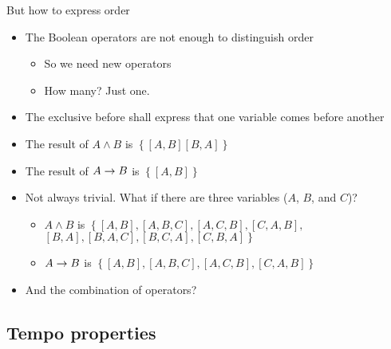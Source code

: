 \documentclass{beamer}
\def\xbeforeop{\ensuremath\rightarrow}
\newcommand{\xbefore}[2]{\ensuremath #1 \xbeforeop #2 }
\begin{document}
\begin{frame}{But how to express order}
	\begin{itemize}
		\item The Boolean operators are not enough to distinguish order
		\begin{itemize}
			\item So we need new operators
			\item How many? Just one.
		\end{itemize}
		\item The exclusive before shall express that one variable comes before another
		\item The result of $A\land B$ is
		$\left\{
			\left[A,B\right]
			\left[B,A\right]
		\right\}$
		\item The result of $\xbefore{A}{B}$ is
		$\left\{
			\left[A,B\right]
		\right\}$
		\item Not always trivial. What if there are three variables ($A$, $B$, and $C$)?
		\begin{itemize}
			\item $A\land B$ is 
				$\left\{
					\left[A,B\right],
					\left[A,B,C\right], 
					\left[A,C,B\right],
					\left[C,A,B\right],\right. $
					$\left.
						\left[B,A\right],
						\left[B,A,C\right], 
						\left[B,C,A\right],
						\left[C,B,A\right]
					\right\}$
			\item $\xbefore{A}{B}$ is 
				$\left\{
					\left[A,B\right], 
					\left[A,B,C\right], 
					\left[A,C,B\right],
					\left[C,A,B\right]
				\right\} $
		\end{itemize}
		\item And the combination of operators?
	\end{itemize}
\end{frame}

\subsection{Tempo properties}
\end{document}
